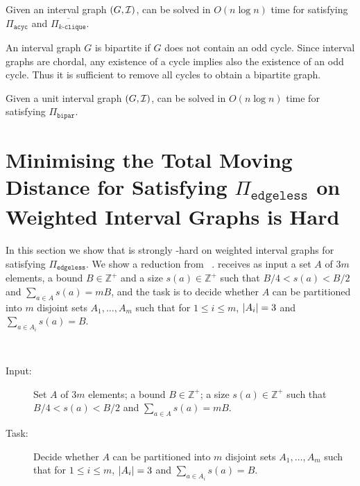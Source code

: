 \begin{corollary}\label{cor:nokclique}
    Given an interval graph $(G,\mathcal{I})$, {\gged} can be solved in $O(n\log n)$ time for satisfying $\Pi_{\texttt{acyc}}$ and $\overline{\Pi_{k\texttt{-clique}}}$.
\end{corollary}

\ifFull
An interval graph $G$ is bipartite if $G$ does not contain an odd cycle. Since interval graphs are chordal, any existence of a cycle implies also the existence of an odd cycle. Thus it is sufficient to remove all cycles to obtain a bipartite graph. 
\begin{corollary}
    Given a unit interval graph $(G,\mathcal{I})$, {\gged} can be solved in $O(n\log n)$ time for satisfying $\Pi_{\texttt{bipar}}$.
\end{corollary}
\fi




\section{Minimising the Total Moving Distance for Satisfying \texorpdfstring{$\Pi_{\texttt{edgeless}}$}{} on Weighted Interval Graphs is Hard}\label{sec:edg_ig}

In this section we show that {\gged} is strongly \NP-hard on weighted interval graphs for satisfying $\Pi_{\texttt{edgeless}}$. We show a reduction from {\threepartition}~\cite{garey1979}.
\ifConf
{\threepartition} receives as input a set $A$ of $3m$ elements, a bound $B \in \mathbb{Z}^+$ and a size $s(a) \in \mathbb{Z}^+$ such that $B/4 <s(a) < B/2$ and $\sum_{a \in A} s(a) = mB$, and the task is to decide whether $A$ can be partitioned into $m$ disjoint sets $A_1,\ldots,A_m$ such that for $1\le i \le m$, $|A_i| = 3$ and $\sum_{a\in A_i} s(a) = B$.
\fi
\ifFull
\begin{itembox}[l]{{\threepartition}~\cite{garey1979}}
    \begin{description}%
        \item[Input:] Set $A$ of $3m$ elements; a bound $B \in \mathbb{Z}^+$; a size $s(a) \in \mathbb{Z}^+$ such that $B/4 <s(a) < B/2$ and $\sum_{a \in A} s(a) = mB$.
        \item[Task:] Decide whether $A$ can be partitioned into $m$ disjoint sets $A_1,\ldots,A_m$ such that for $1\le i \le m$, $|A_i| = 3$ and $\sum_{a\in A_i} s(a) = B$.
    \end{description}
\end{itembox}
\fi

